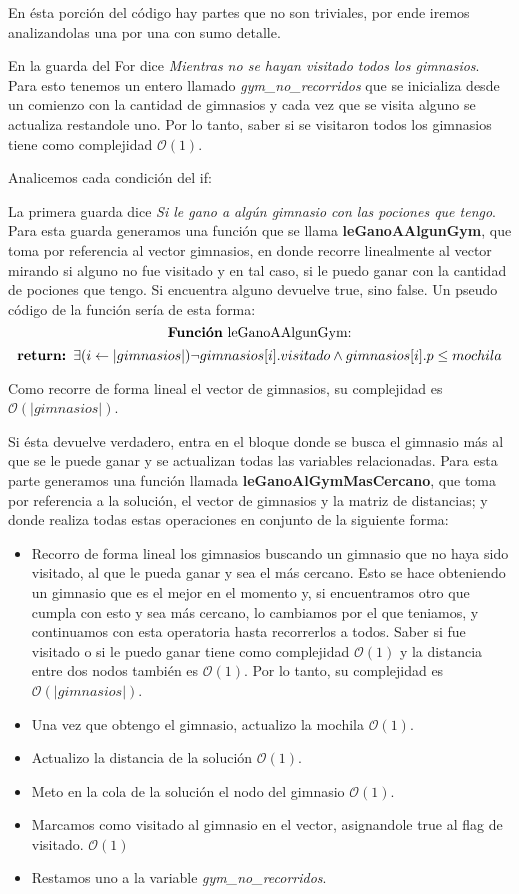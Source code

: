 En ésta porción del código hay partes que no son triviales, por ende iremos analizandolas una por una con sumo detalle.

En la guarda del For dice \textit{Mientras no se hayan visitado todos los gimnasios}. Para esto tenemos un entero llamado \emph{gym\_no\_recorridos} que se inicializa desde un comienzo con la cantidad de gimnasios y cada vez que se visita alguno se actualiza restandole uno. Por lo tanto, saber si se visitaron todos los gimnasios tiene como complejidad $\mathcal{O}(1)$.

Analicemos cada condición del if:

La primera guarda dice \textit{Si le gano a algún gimnasio con las pociones que tengo}. Para esta guarda generamos una función que se llama \textbf{leGanoAAlgunGym}, que toma por referencia al vector gimnasios, en donde recorre linealmente al vector mirando si alguno no fue visitado y en tal caso, si le puedo ganar con la cantidad de pociones que tengo. Si encuentra alguno devuelve true, sino false.
Un pseudo código de la función sería de esta forma:
\[
	\text{\textbf{Función} leGanoAAlgunGym:}
\]
\[
	\text{\textbf{return: }} \exists (i \leftarrow |gimnasios|) \neg gimnasios[i].visitado \land gimnasios[i].p \leq mochila
\]

Como recorre de forma lineal el vector de gimnasios, su complejidad es $\mathcal{O}(|gimnasios|)$.

Si ésta devuelve verdadero, entra en el bloque donde  se busca el gimnasio más al que se le puede ganar y se actualizan todas las variables relacionadas. Para esta parte generamos una función llamada \textbf{leGanoAlGymMasCercano}, que toma por referencia a la solución, el vector de gimnasios y la matriz de distancias; y donde realiza todas estas operaciones en conjunto de la siguiente forma:

\begin{itemize}
	\item Recorro de forma lineal los gimnasios buscando un gimnasio que no haya sido visitado, al que le pueda ganar y sea el más cercano. Esto se hace obteniendo un gimnasio que es el mejor en el momento y, si encuentramos otro que cumpla con esto y sea más cercano, lo cambiamos por el que teniamos, y continuamos con esta operatoria hasta recorrerlos a todos. Saber si fue visitado o si le puedo ganar tiene como complejidad $\mathcal{O}(1)$ y la distancia entre dos nodos también es $\mathcal{O}(1)$. Por lo tanto, su complejidad es $\mathcal{O}(|gimnasios|)$.
	\item Una vez que obtengo el gimnasio, actualizo la mochila $\mathcal{O}(1)$.
	\item Actualizo la distancia de la solución $\mathcal{O}(1)$.
	\item Meto en la cola de la solución el nodo del gimnasio $\mathcal{O}(1)$.
	\item Marcamos como visitado al gimnasio en el vector, asignandole true al flag de visitado. $\mathcal{O}(1)$
	\item Restamos uno a la variable \emph{gym\_no\_recorridos}.
\end{itemize}

